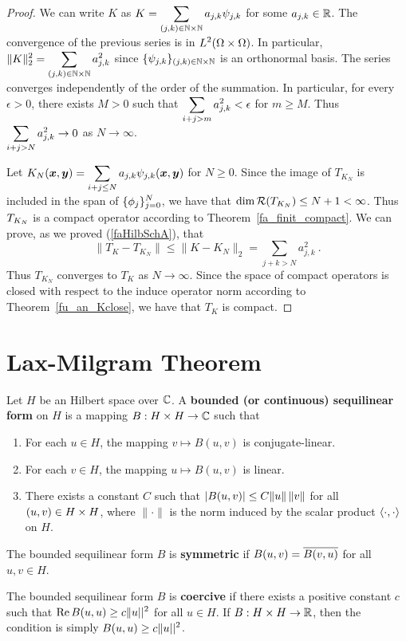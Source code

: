\begin{proof}
We can write $K$ as
$\displaystyle K = \sum_{(j,k)\in \mathbb{N}\times \mathbb{N}} a_{j,k} \psi_{j,k}$
for some $a_{j,k} \in \mathbb{R}$.  The convergence of the previous series is
in $\displaystyle L^2(\Omega\times \Omega)$.  In particular,
$\displaystyle \|K\|_2^2 = \sum_{(j,k)\in \mathbb{N}\times \mathbb{N}} a_{j,k}^2$
since $\displaystyle \{\psi_{j,k}\}_{(j,k)\in \mathbb{N}\times \mathbb{N}}$ is an
orthonormal basis.  The series converges independently of the order
of the summation.  In particular, for every $\epsilon >0$, there
exists $M>0$ such that $\displaystyle \sum_{i+j > m} a_{j,k}^2 < \epsilon$
for $m\geq M$.  Thus $\displaystyle \sum_{i+j > N} a_{j,k}^2 \to 0$ as
$N \to \infty$.

Let $\displaystyle
K_N({\bm{x}}, {\bm{y}}) = \sum_{i+j\leq N} a_{j,k} \psi_{j,k}({\bm{x}},{\bm{y}})$
for $N \geq 0$.  Since the image of $T_{K_N}$ is included in the
span of $\displaystyle \{\phi_j\}_{j=0}^N$, we have that
$\dim \mathcal{R}(T_{K_N}) \leq N +1 < \infty$.  Thus
$\displaystyle T_{K_N}$ is a compact
operator according to Theorem~\ref{fa_finit_compact}.  We can prove, as
we proved (\ref{faHilbSchA}), that 
\[
\|T_K - T_{K_N} \| \leq \| K - K_N\|_2 = \sum_{j+k>N} a_{j,k}^2 \ .
\]
Thus $T_{K_N}$ converges to $T_K$ as $N\to \infty$.  Since the space
of compact operators is closed with respect to the induce operator
norm according to Theorem~\ref{fu_an_Kclose},
we have that $T_K$ is compact.
\end{proof}

\section{Lax-Milgram Theorem}

\begin{defn}
Let $H$ be an Hilbert space over $\mathbb{C}$.  A
{\bfseries bounded (or continuous) sequilinear form}%
on $H$ is a mapping $B:H\times H \rightarrow \mathbb{C}$ such that
\begin{enumerate}
\item For each $u\in H$, the mapping $v \mapsto B(u,v)$ is conjugate-linear.
\item For each $v\in H$, the mapping $u \mapsto B(u,v)$ is linear.
\item There exists a constant $C$ such that
$\displaystyle \left| B(u,v) \right| \leq C \| u\| \, \| v\|$
for all $\displaystyle (u,v) \in H \times H$, where $\|\cdot\|$ is the
norm induced by the scalar product $\left\langle{\cdot} , {\cdot}\right\rangle$ on $H$.
\end{enumerate}

The bounded sequilinear form $B$ is
{\bfseries symmetric} if
$\displaystyle B(u,v) = \overline{B(v,u)}$ for all $u,v \in H$.

The bounded sequilinear form $B$ is
{\bfseries coercive} if there
exists a positive constant $c$ such that
$\displaystyle \operatorname{Re} B(u,u) \geq c \|u||^2$ for all $u \in H$.  If
$B:H\times H \rightarrow \mathbb{R}$, then the condition is simply
$\displaystyle B(u,u) \geq c \|u||^2$.
\end{defn}

